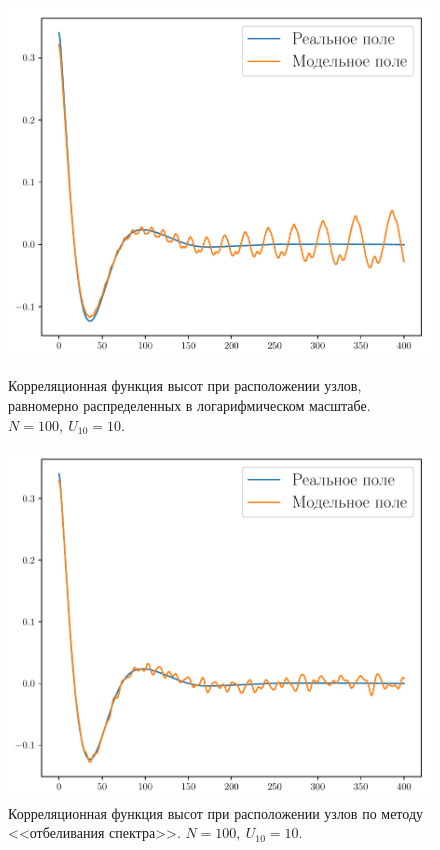 \begin{figure}[h!]
\begin{minipage}[h]{0.45\linewidth}
	\centering
	\includegraphics[width=\linewidth]{fig/correlation_hlog_100.pdf}
	\caption{Корреляционная функция высот при расположении узлов, равномерно распределенных в логарифмическом масштабе. $N=100, ~U_{10}=10$.}
	\label{fig:cor_h_b}
\end{minipage}
\hfill
\begin{minipage}[h]{0.45\linewidth}
	\centering
	\includegraphics[width=\linewidth]{fig/correlation_hwn_100.pdf}
	\caption{Корреляционная функция высот при расположении узлов по методу <<отбеливания спектра>>. $N=100, ~U_{10}=10$.}
	\label{fig:cor_h_a}
\end{minipage}
\end{figure}


